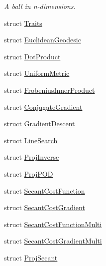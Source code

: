 \begin{DoxyCompactItemize}
\begin{DoxyCompactList}\small\item\em A ball in n-\/dimensions. \end{DoxyCompactList}\item 
struct \hyperlink{struct_d_r_d_s_p_1_1_traits}{Traits}
\item 
struct \hyperlink{struct_d_r_d_s_p_1_1_euclidean_geodesic}{Euclidean\-Geodesic}
\item 
struct \hyperlink{struct_d_r_d_s_p_1_1_dot_product}{Dot\-Product}
\item 
struct \hyperlink{struct_d_r_d_s_p_1_1_uniform_metric}{Uniform\-Metric}
\item 
struct \hyperlink{struct_d_r_d_s_p_1_1_frobenius_inner_product}{Frobenius\-Inner\-Product}
\item 
struct \hyperlink{struct_d_r_d_s_p_1_1_conjugate_gradient}{Conjugate\-Gradient}
\item 
struct \hyperlink{struct_d_r_d_s_p_1_1_gradient_descent}{Gradient\-Descent}
\item 
struct \hyperlink{struct_d_r_d_s_p_1_1_line_search}{Line\-Search}
\item 
struct \hyperlink{struct_d_r_d_s_p_1_1_proj_inverse}{Proj\-Inverse}
\item 
struct \hyperlink{struct_d_r_d_s_p_1_1_proj_p_o_d}{Proj\-P\-O\-D}
\item 
struct \hyperlink{struct_d_r_d_s_p_1_1_secant_cost_function}{Secant\-Cost\-Function}
\item 
struct \hyperlink{struct_d_r_d_s_p_1_1_secant_cost_gradient}{Secant\-Cost\-Gradient}
\item 
struct \hyperlink{struct_d_r_d_s_p_1_1_secant_cost_function_multi}{Secant\-Cost\-Function\-Multi}
\item 
struct \hyperlink{struct_d_r_d_s_p_1_1_secant_cost_gradient_multi}{Secant\-Cost\-Gradient\-Multi}
\item 
struct \hyperlink{struct_d_r_d_s_p_1_1_proj_secant}{Proj\-Secant}
\end{DoxyCompactItemize}
